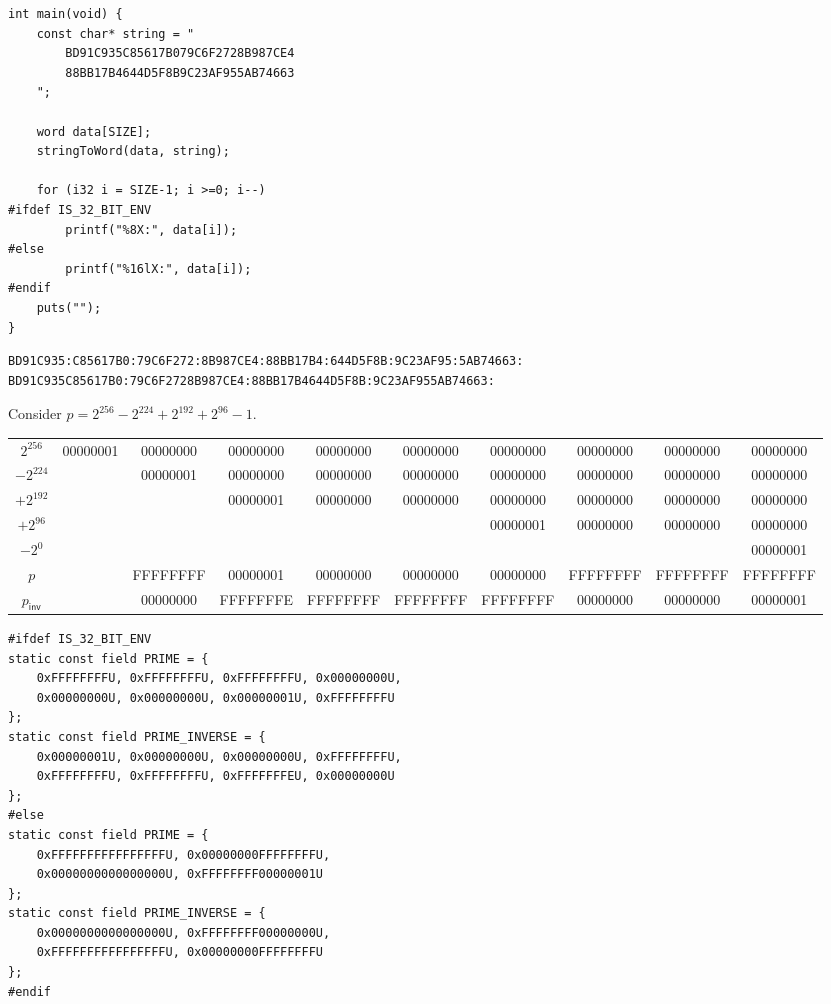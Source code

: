 \begin{lstlisting}[style=C]
int main(void) {
	const char* string = "
		BD91C935C85617B079C6F2728B987CE4
		88BB17B4644D5F8B9C23AF955AB74663
	";
	
	word data[SIZE];
	stringToWord(data, string);
	
	for (i32 i = SIZE-1; i >=0; i--)
#ifdef IS_32_BIT_ENV
		printf("%8X:", data[i]);
#else
		printf("%16lX:", data[i]);
#endif
	puts("");
}
\end{lstlisting}
{\small\begin{lstlisting}[style=zsh]
BD91C935:C85617B0:79C6F272:8B987CE4:88BB17B4:644D5F8B:9C23AF95:5AB74663:
BD91C935C85617B0:79C6F2728B987CE4:88BB17B4644D5F8B:9C23AF955AB74663:
\end{lstlisting}}

\newpage
\begin{example}[secp256r1]
Consider $p = 2^{256} - 2^{224} + 2^{192} + 2^{96} - 1$.
\begin{table}[h!]\centering\renewcommand{\arraystretch}{1.25}
{\ttfamily\footnotesize\begin{tabular*}{\textwidth}{@{\extracolsep{\fill}}cccccccccc}
		$2^{256}$ & 00000001 & 00000000 & 00000000 & 00000000 & 00000000 & 00000000 & 00000000 & 00000000 & 00000000\\
		$-2^{224}$ & & 00000001 & 00000000 & 00000000 & 00000000 & 00000000 & 00000000 & 00000000 & 00000000 \\
		$+2^{192}$ & & & 00000001 & 00000000 & 00000000 & 00000000 & 00000000 & 00000000 & 00000000\\
		$+2^{96}$ & & & & & & 00000001 & 00000000 & 00000000 & 00000000 \\
		$-2^{0}$ & & & & & & & & & 00000001 \\ \cline{1-10}
		$p$ & & FFFFFFFF & 00000001 & 00000000 & 00000000 & 00000000 & FFFFFFFF & FFFFFFFF & FFFFFFFF \\
		$p_{\mathsf{inv}}$ & & 00000000 & FFFFFFFE & FFFFFFFF & FFFFFFFF & FFFFFFFF & 00000000 & 00000000 & 00000001 \\
\end{tabular*}}
\end{table}
\begin{lstlisting}[style=C]
#ifdef IS_32_BIT_ENV
static const field PRIME = {
	0xFFFFFFFFU, 0xFFFFFFFFU, 0xFFFFFFFFU, 0x00000000U,
	0x00000000U, 0x00000000U, 0x00000001U, 0xFFFFFFFFU
};
static const field PRIME_INVERSE = {
	0x00000001U, 0x00000000U, 0x00000000U, 0xFFFFFFFFU,
	0xFFFFFFFFU, 0xFFFFFFFFU, 0xFFFFFFFEU, 0x00000000U
};
#else
static const field PRIME = {
	0xFFFFFFFFFFFFFFFFU, 0x00000000FFFFFFFFU,
	0x0000000000000000U, 0xFFFFFFFF00000001U
};
static const field PRIME_INVERSE = {
	0x0000000000000000U, 0xFFFFFFFF00000000U,
	0xFFFFFFFFFFFFFFFFU, 0x00000000FFFFFFFFU
};
#endif
\end{lstlisting}
\end{example}


